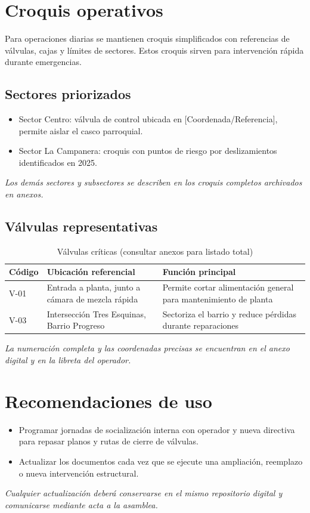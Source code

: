 \section{Croquis operativos}

Para operaciones diarias se mantienen croquis simplificados con referencias de válvulas, cajas y límites de sectores. Estos croquis sirven para intervención rápida durante emergencias.

\subsection*{Sectores priorizados}
\begin{itemize}[noitemsep, topsep=0pt]
  \item Sector Centro: válvula de control ubicada en [Coordenada/Referencia], permite aislar el casco parroquial.
  \item Sector La Campanera: croquis con puntos de riesgo por deslizamientos identificados en 2025.
\end{itemize}
\textit{Los demás sectores y subsectores se describen en los croquis completos archivados en anexos.}

\subsection*{Válvulas representativas}
\begin{table}[H]
\centering
\caption{Válvulas críticas (consultar anexos para listado total)}
\label{tab:valvulas_representativas}
\begin{tabular}{p{2.2cm} p{6.2cm} p{5.3cm}}
\toprule
\textbf{Código} & \textbf{Ubicación referencial} & \textbf{Función principal} \\
\midrule
V-01 & Entrada a planta, junto a cámara de mezcla rápida & Permite cortar alimentación general para mantenimiento de planta \\
V-03 & Intersección Tres Esquinas, Barrio Progreso & Sectoriza el barrio y reduce pérdidas durante reparaciones \\
\bottomrule
\end{tabular}
\end{table}
\textit{La numeración completa y las coordenadas precisas se encuentran en el anexo digital y en la libreta del operador.}

\section{Recomendaciones de uso}

\begin{itemize}[noitemsep, topsep=0pt]
  \item Programar jornadas de socialización interna con operador y nueva directiva para repasar planos y rutas de cierre de válvulas.
  \item Actualizar los documentos cada vez que se ejecute una ampliación, reemplazo o nueva intervención estructural.
\end{itemize}
\textit{Cualquier actualización deberá conservarse en el mismo repositorio digital y comunicarse mediante acta a la asamblea.}
